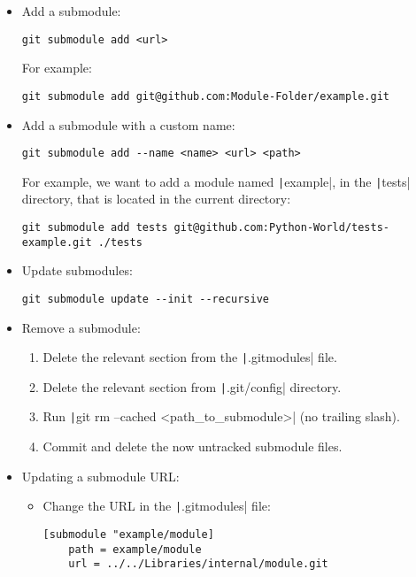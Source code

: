 \begin{itemize}
    \item Add a submodule:
    \begin{verbatim}
git submodule add <url>
    \end{verbatim}
    For example:
    \begin{verbatim}
git submodule add git@github.com:Module-Folder/example.git
    \end{verbatim}
    \item Add a submodule with a custom name:
    \begin{verbatim}
git submodule add --name <name> <url> <path>
    \end{verbatim}
    For example, we want to add a module named \texttt|example|, in the
    \texttt|tests| directory, that is located in the current
    directory:
    \begin{verbatim}
git submodule add tests git@github.com:Python-World/tests-example.git ./tests
    \end{verbatim}
    \item Update submodules:
    \begin{verbatim}
git submodule update --init --recursive
    \end{verbatim}
    \item Remove a submodule:
    \begin{enumerate}
        \item Delete the relevant section from the \texttt|.gitmodules| file.
        \item Delete the relevant section from \texttt|.git/config| directory.
        \item Run \texttt|git rm --cached <path_to_submodule>| (no trailing slash).
        \item Commit and delete the now untracked submodule files.
    \end{enumerate}
    \item Updating a submodule URL:
    \begin{itemize}
        \item Change the URL in the \texttt|.gitmodules| file:
        \begin{verbatim}
[submodule "example/module]
    path = example/module
    url = ../../Libraries/internal/module.git
        \end{verbatim}

\end{itemize}
\end{itemize}
